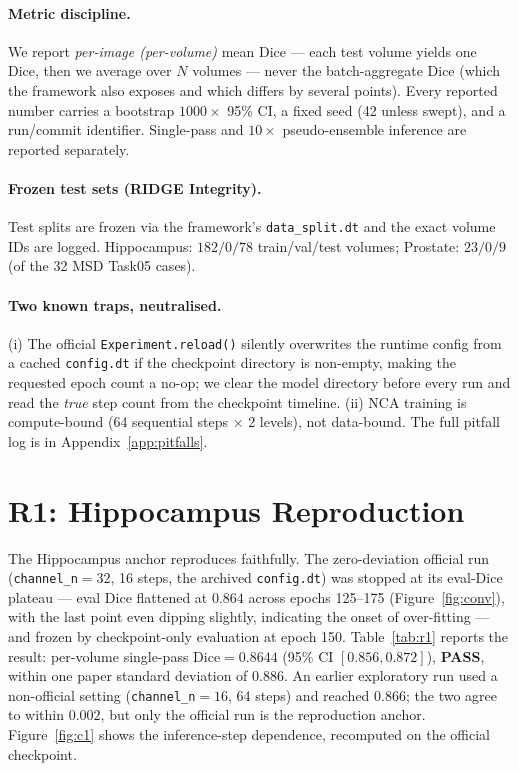 \documentclass[10pt,twocolumn]{article}
\newcommand{\pass}{\textcolor{passgreen}{\textbf{PASS}}}
\newcommand{\dice}{\mathrm{Dice}}
\begin{document}
\paragraph{Metric discipline.}
We report \emph{per-image (per-volume)} mean Dice --- each test volume
yields one Dice, then we average over $N$ volumes --- never the
batch-aggregate Dice (which the framework also exposes and which differs by
several points). Every reported number carries a bootstrap $1000\times$
95\% CI, a fixed seed (42 unless swept), and a run/commit identifier.
Single-pass and $10\times$ pseudo-ensemble inference are reported
separately.

\paragraph{Frozen test sets (RIDGE Integrity).}
Test splits are frozen via the framework's \texttt{data\_split.dt} and the
exact volume IDs are logged. Hippocampus: $182/0/78$ train/val/test
volumes; Prostate: $23/0/9$ (of the 32 MSD Task05 cases).

\paragraph{Two known traps, neutralised.}
(i) The official \texttt{Experiment.reload()} silently overwrites the
runtime config from a cached \texttt{config.dt} if the checkpoint directory
is non-empty, making the requested epoch count a no-op; we clear the model
directory before every run and read the \emph{true} step count from the
checkpoint timeline. (ii) NCA training is compute-bound (64 sequential
steps $\times$ 2 levels), not data-bound. The full pitfall log is in
Appendix~\ref{app:pitfalls}.

\section{R1: Hippocampus Reproduction}
\label{sec:r1}

The Hippocampus anchor reproduces faithfully. The zero-deviation official
run (\texttt{channel\_n}$=32$, 16 steps, the archived \texttt{config.dt})
was stopped at its eval-Dice plateau --- eval Dice flattened at $0.864$
across epochs 125--175 (Figure~\ref{fig:conv}), with the last point even
dipping slightly, indicating the onset of over-fitting --- and frozen by
checkpoint-only evaluation at epoch 150. Table~\ref{tab:r1} reports the
result: per-volume single-pass $\dice=0.8644$ (95\% CI $[0.856,0.872]$),
\pass, within one paper standard deviation of $0.886$. An earlier
exploratory run used a non-official setting (\texttt{channel\_n}$=16$, 64
steps) and reached $0.866$; the two agree to within $0.002$, but only the
official run is the reproduction anchor. Figure~\ref{fig:c1} shows the
inference-step dependence, recomputed on the official checkpoint.
\end{document}
